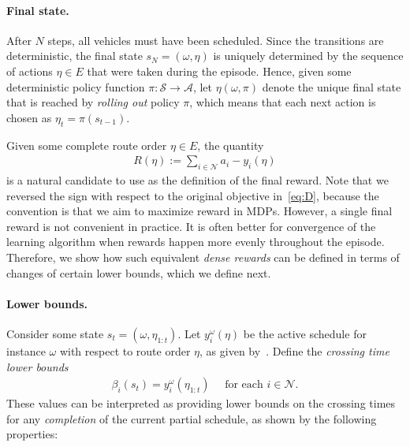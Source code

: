 \documentclass[a4paper]{report}
\theoremstyle{definition}
\theoremstyle{plain}
\begin{document}
\paragraph{Final state.}
After $N$ steps, all vehicles must have been scheduled. Since the transitions
are deterministic, the final state $s_N = (\omega,\eta)$ is uniquely determined
by the sequence of actions $\eta \in E$ that were taken during the episode.
Hence, given some deterministic policy function
$\pi : \mathcal{S} \rightarrow \mathcal{A}$, let $\eta(\omega, \pi)$ denote the
unique final state that is reached by \emph{rolling out} policy $\pi$, which
means that each next action is chosen as $\eta_t = \pi(s_{t-1})$.

Given some complete route order $\eta \in E$, the quantity
\begin{align}
  R(\eta) := \sum_{i \in \mathcal{N}} a_i - y_i(\eta)
\end{align}
is a natural candidate to use as the definition of the final reward. Note that
we reversed the sign with respect to the original objective in~\eqref{eq:D}, because the
convention is that we aim to maximize reward in MDPs.
%
However, a single final reward is not convenient in practice. It is often better
for convergence of the learning algorithm when rewards happen more evenly
throughout the episode.
%
Therefore, we show how such equivalent \emph{dense rewards} can be defined in
terms of changes of certain lower bounds, which we define next.


\paragraph{Lower bounds.}
Consider some state $s_t = (\omega, \eta_{1:t})$. Let $y^\omega_i(\eta)$ be the active
schedule for instance $\omega$ with respect to route order $\eta$, as given
by~. Define the \emph{crossing time lower bounds}
\begin{align}
  \beta_i(s_t) = y^\omega_i(\eta_{1:t}) \quad \text{ for each } i \in \mathcal{N} .
\end{align}
%
These values can be interpreted as providing lower bounds on the crossing times
for any \emph{completion} of the current partial schedule, as shown by the following
properties:
\end{document}
